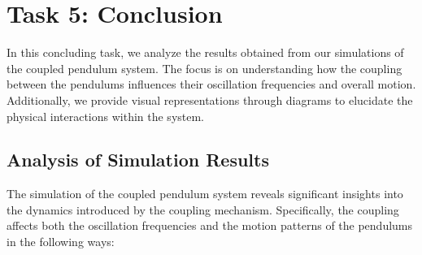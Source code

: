 \documentclass[12pt]{report} %
\begin{document}
\newpage


\section{Task 5: Conclusion}
\label{sec:part1_task5}

In this concluding task, we analyze the results obtained from our simulations of the coupled pendulum system. The focus is on understanding how the coupling between the pendulums influences their oscillation frequencies and overall motion. Additionally, we provide visual representations through diagrams to elucidate the physical interactions within the system.

\subsection{Analysis of Simulation Results}
\label{subsec:part1_task5_analysis}

The simulation of the coupled pendulum system reveals significant insights into the dynamics introduced by the coupling mechanism. Specifically, the coupling affects both the oscillation frequencies and the motion patterns of the pendulums in the following ways:
\end{document}
